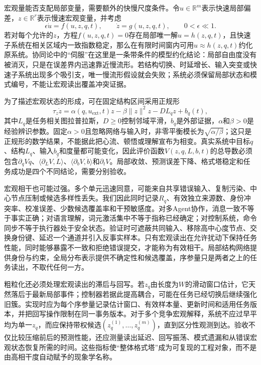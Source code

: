 宏观量能否支配局部变量，需要额外的快慢尺度条件。令$u\in\mathbb R^m$表示快速局部偏差，$z\in\mathbb R^r$表示慢速宏观变量，并考虑
\begin{equation}
\epsilon\dot u=f(u,z,q,t),\qquad \dot z=g(u,z,q,t),\qquad 0<\epsilon\ll1.
\label{eq:coherence_fast_slow_system}
\end{equation}
若对每个允许的$z$，方程$f(u,z,q,t)=0$存在局部唯一解$u=h(z,q,t)$，且快速子系统在相关区域内一致指数稳定，那么在有限时间窗内可用$u\approx h(z,q,t)$约化原系统。协同论中的“伺服”在这里是一条带条件的模型约化结论：局部自由度没有被消灭，只是在误差界内迅速靠近慢流形。若结构切换、时延增长、输入突变或快速子系统出现多个吸引支，唯一慢流形假设就会失败；系统必须保留局部状态和模式编号，不能让宏观读出覆盖冲突证据。

为了描述宏观状态的形成，可在固定结构区间采用正规形
\begin{equation}
\tau_z\dot z=\alpha(q,u_{\mathrm{ext}},t)z-\beta\|z\|^2z-DL_qz+b_q(t),
\label{eq:coherence_normal_form}
\end{equation}
其中$L_q$是任务相关图拉普拉斯，$D\geq0$控制邻域平滑，$b_q$是外部证据，$\alpha$和$\beta>0$是经验辨识参数。固定$\alpha>0$且忽略网络与输入时，非零平衡模长为$\sqrt{\alpha/\beta}$；这只是正规形的数学结果，不能据此把心流、顿悟或理解宣布为相变。真实系统中目标$q$、结构$L_q$、输入$b_q$和度量都可能变化，因此评价函数$V(z,q,L,b,t)$的总导数必须包含$\partial_qV\dot q$、$\langle\partial_LV,\dot L\rangle$、$\langle\partial_bV,\dot b\rangle$和$\partial_tV$。局部收敛、预测误差下降、格式塔稳定和任务成功是四个不同结论，需要分别验收。

宏观相干也可能过强。多个单元迅速同意，可能来自共享错误输入、复制污染、中心节点压制或候选多样性丢失。我们因此同时记录$R_q$、有效独立来源数、身份冲突率、校准误差、少数候选覆盖率和干预敏感度。对多Agent协作，消息一致不等于事实正确；对语言理解，词元激活集中不等于指称已经确定；对控制系统，命令同步不等于执行器处于安全状态。验证时可遮蔽共同输入、移除高中心度节点、交换身份键、延迟一个通道并引入反事实样本。只有宏观读出在允许扰动下保持任务性能，同时能够暴露不一致和拒绝错误提交，才能称为有效相干。局部结构网络提供身份与约束，全局分布表示提供不确定性和候选覆盖，序参量只是两者之上的任务读出，不取代任何一方。

粗粒化还必须处理宏观读出的滞后与回写。若$z_q$由长度为$W$的滑动窗口估计，它天然落后于最新局部事件；控制器若据此提高耦合，可能在任务已经切换后继续强化旧簇。实现时应为每个序参量记录估计窗口、有效样本量、更新时间和适用任务版本，并把回写操作限制在同一事务版本。对于多个竞争宏观解释，系统不应过早平均为单一$z_q$，而应保持带权候选$(z_q^{(1)},\ldots,z_q^{(m)})$，直到区分性观测到达。验收不仅比较压缩前后的预测性能，还应测量读出延迟、回写振荡、模式遗漏和从错误宏观状态恢复所需的时间。这些指标使“整体格式塔”成为可复现的工程对象，而不是由高相干度自动赋予的现象学名称。

